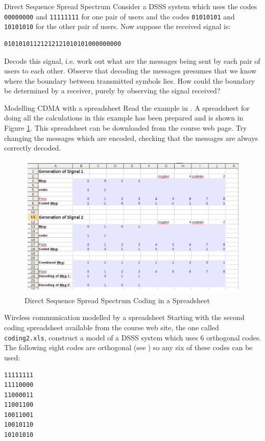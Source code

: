 \begin{exercise}{Direct Sequence Spread Spectrum}
Consider a DSSS system which uses the codes \verb|00000000| and \verb|11111111| for
one pair of users and the codes \verb|01010101| and \verb|10101010| for the other pair of users.
Now suppose the received signal is:
\begin{verbatim}
01010101121212121010101000000000
\end{verbatim}
Decode this signal, i.e. work out what are the messages being sent by each pair of users
to each other. Observe that decoding the messages presumes that we know where the
boundary between transmitted symbols lies. How could the boundary be determined
by a receiver, purely by observing the signal received?
\end{exercise}


\begin{sbexample}{Modelling CDMA with a spreadsheet}%
Read the example in \cite{cdmawiki}. A spreadsheet for doing all the
calculations in this example has been prepared and is shown in Figure
\ref{cdmaspread}. This spreadsheet can be downloaded from the course
web page. Try changing the messages which are encoded, checking that
the messages are always correctly decoded.

\begin{figure}
\begin{center}
\includegraphics[width=15 cm]{cdmaspreadsheet.png}
\caption{Direct Sequence Spread Spectrum Coding in a Spreadsheet}\label{cdmaspread}
\end{center}
\end{figure}
\end{sbexample}

\begin{exercise}{Wireless communication modelled by a spreadsheet}
Starting with the second coding spreadsheet available from the course
web site, the one called \verb|coding2.xls|, construct a model of a
DSSS system which uses 6 orthogonal codes. The following eight codes
are orthogonal (see \cite{wolframwalsh}) so any six of these codes can
be used:

\begin{verbatim}
11111111
11110000
11000011
11001100
10011001
10010110
10101010
\end{verbatim}

\end{exercise}

